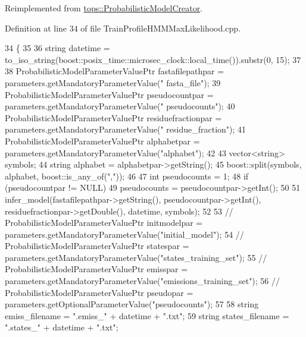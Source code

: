 Reimplemented from \hyperlink{classtops_1_1ProbabilisticModelCreator_afed6c8ffa45fff446bdaa8b533da8f7c}{tops\+::\+Probabilistic\+Model\+Creator}.



Definition at line 34 of file Train\+Profile\+H\+M\+M\+Max\+Likelihood.\+cpp.


\begin{DoxyCode}
34                                                                                                           \{
35 
36     \textcolor{keywordtype}{string} datetime = to\_iso\_string(boost::posix\_time::microsec\_clock::local\_time()).substr(0, 15);
37 
38     ProbabilisticModelParameterValuePtr fastafilepathpar = parameters.getMandatoryParameterValue(\textcolor{stringliteral}{"
      fasta\_file"});
39     ProbabilisticModelParameterValuePtr pseudocountpar = parameters.getMandatoryParameterValue(\textcolor{stringliteral}{"
      pseudocounts"});
40     ProbabilisticModelParameterValuePtr residuefractionpar = parameters.getMandatoryParameterValue(\textcolor{stringliteral}{"
      residue\_fraction"});
41     ProbabilisticModelParameterValuePtr alphabetpar = parameters.getMandatoryParameterValue(\textcolor{stringliteral}{"alphabet"});
42 
43     vector<string> symbols;
44     \textcolor{keywordtype}{string} alphabet = alphabetpar->getString();
45     boost::split(symbols, alphabet, boost::is\_any\_of(\textcolor{stringliteral}{","}));
46 
47     \textcolor{keywordtype}{int} pseudocounts = 1;
48     \textcolor{keywordflow}{if} (pseudocountpar != NULL)
49         pseudocounts = pseudocountpar->getInt();
50 
51     infer\_model(fastafilepathpar->getString(), pseudocountpar->getInt(), residuefractionpar->getDouble(), 
      datetime, symbols);
52 
53 \textcolor{comment}{//    ProbabilisticModelParameterValuePtr initmodelpar =
       parameters.getMandatoryParameterValue("initial\_model");}
54 \textcolor{comment}{//    ProbabilisticModelParameterValuePtr statespar =
       parameters.getMandatoryParameterValue("states\_training\_set");}
55 \textcolor{comment}{//    ProbabilisticModelParameterValuePtr emisspar =
       parameters.getMandatoryParameterValue("emissions\_training\_set");}
56 \textcolor{comment}{//    ProbabilisticModelParameterValuePtr pseudopar = parameters.getOptionalParameterValue("pseudocounts");}
57 
58     \textcolor{keywordtype}{string} emiss\_filename = \textcolor{stringliteral}{".emiss\_"} + datetime + \textcolor{stringliteral}{".txt"};
59     \textcolor{keywordtype}{string} states\_filename = \textcolor{stringliteral}{".states\_"} + datetime + \textcolor{stringliteral}{".txt"};

\end{DoxyCode}
